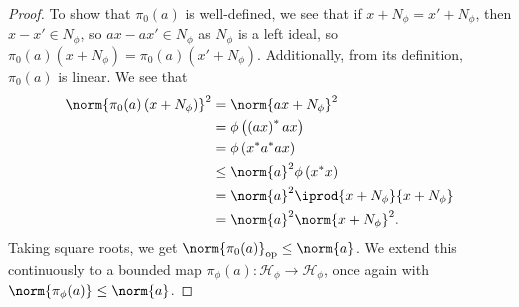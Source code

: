 \documentclass[10pt]{mypackage}
\DeclareMathOperator{\op}{op}
\begin{document}
\begin{proof}
  To show that $\pi_0(a)$ is well-defined, we see that if $x + N_{\phi} = x' + N_{\phi}$, then $x-x' \in N_{\phi}$, so $ax - ax'\in N_{\phi}$ as $N_{\phi}$ is a left ideal, so $\pi_0(a)(x + N_{\phi}) = \pi_0(a)(x' + N_{\phi})$. Additionally, from its definition, $\pi_0(a)$ is linear. We see that
  \begin{align*}
    \norm{\pi_0(a)\left(x + N_{\phi}\right)}^2 &= \norm{ax + N_{\phi}}^2\\
                                               &= \phi\left(\left(ax\right)^{\ast}ax\right)\\
                                               &= \phi\left(x^{\ast}a^{\ast}ax\right)\\
                                               &\leq \norm{a}^2\phi\left(x^{\ast}x\right)\\
                                               &= \norm{a}^2 \iprod{x + N_{\phi}}{x + N_{\phi}}\\
                                               &= \norm{a}^2\norm{x + N_{\phi}}^2.
  \end{align*}
  Taking square roots, we get $\norm{\pi_0(a)}_{\op}\leq \norm{a}$. We extend this continuously to a bounded map $\pi_{\phi}(a)\colon \mathcal{H}_{\phi}\rightarrow \mathcal{H}_{\phi}$, once again with $\norm{\pi_{\phi}(a)}\leq \norm{a}$.\newline


\end{proof}
\end{document}
